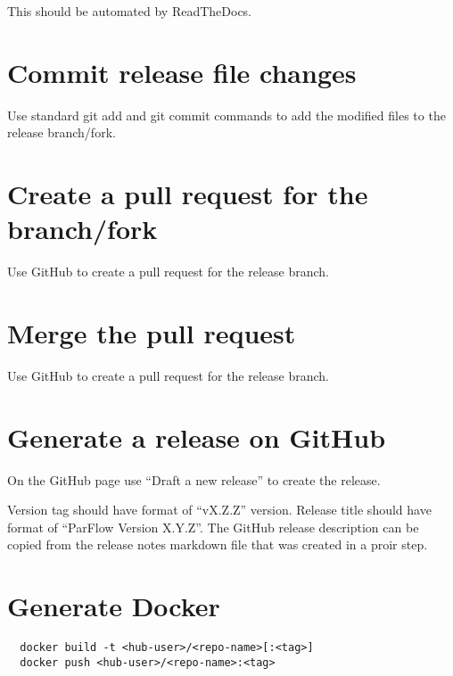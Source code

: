 This should be automated by ReadTheDocs.
  
\section{Commit release file changes}

Use standard git add and git commit commands to add the modified files
to the release branch/fork.

\section{Create a pull request for the branch/fork}

Use GitHub to create a pull request for the release branch.
  
\section{Merge the pull request}

Use GitHub to create a pull request for the release branch.
  
\section{Generate a release on GitHub}

On the GitHub  page use
``Draft a new release'' to create the release.

Version tag should have format of ``vX.Z.Z'' version.  Release title
should have format of ``ParFlow Version X.Y.Z''.  The GitHub release
description can be copied from the release notes markdown file that
was created in a proir step.

\section{Generate Docker}

\begin{display}\begin{verbatim}
  docker build -t <hub-user>/<repo-name>[:<tag>]
  docker push <hub-user>/<repo-name>:<tag>
\end{verbatim}\end{display}
